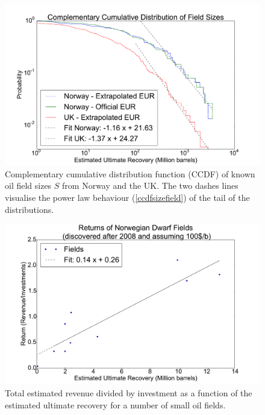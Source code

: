 \documentclass[review]{elsarticle}
\begin{document}
\pagebreak

\begin{figure}[H]
\includegraphics[width=1\columnwidth]{ccdf-field-size}
\caption{Complementary 
cumulative distribution function (CCDF) of known oil field sizes $S$ from Norway and the UK.
The two dashes lines visualise the power law behaviour (\ref{ccdfsizefield}) of the tail
of the distributions. }
\label{ccdffieldsizes}
\end{figure}

\pagebreak

\begin{figure}[H]
\includegraphics[width=1\columnwidth]{no-returns-size}
\caption{Total estimated revenue divided by investment as a function of the estimated 
ultimate recovery for a number of small oil fields. }
\label{returnNorwayfield}
\end{figure}
\end{document}
